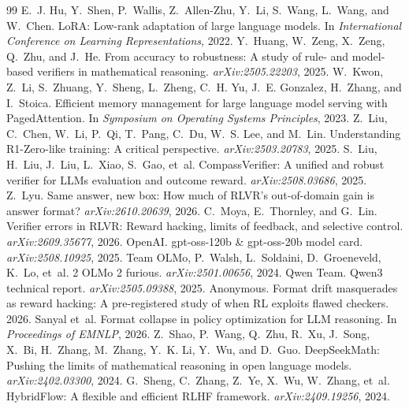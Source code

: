 \documentclass[10pt]{article}
\begin{document}
\begin{thebibliography}{99}
 E.~J. Hu, Y.~Shen, P.~Wallis, Z.~Allen-Zhu, Y.~Li, S.~Wang, L.~Wang, and W.~Chen. {LoRA}: Low-rank adaptation of large language models. In \emph{International Conference on Learning Representations}, 2022.
 Y.~Huang, W.~Zeng, X.~Zeng, Q.~Zhu, and J.~He. From accuracy to robustness: A study of rule- and model-based verifiers in mathematical reasoning. \emph{arXiv:2505.22203}, 2025.
 W.~Kwon, Z.~Li, S.~Zhuang, Y.~Sheng, L.~Zheng, C.~H. Yu, J.~E. Gonzalez, H.~Zhang, and I.~Stoica. Efficient memory management for large language model serving with {PagedAttention}. In \emph{Symposium on Operating Systems Principles}, 2023.
 Z.~Liu, C.~Chen, W.~Li, P.~Qi, T.~Pang, C.~Du, W.~S. Lee, and M.~Lin. Understanding {R1-Zero}-like training: A critical perspective. \emph{arXiv:2503.20783}, 2025.
 S.~Liu, H.~Liu, J.~Liu, L.~Xiao, S.~Gao, et~al. {CompassVerifier}: A unified and robust verifier for {LLMs} evaluation and outcome reward. \emph{arXiv:2508.03686}, 2025.
 Z.~Lyu. Same answer, new box: How much of {RLVR}'s out-of-domain gain is answer format? \emph{arXiv:2610.20639}, 2026.
 C.~Moya, E.~Thornley, and G.~Lin. Verifier errors in {RLVR}: Reward hacking, limits of feedback, and selective control. \emph{arXiv:2609.35677}, 2026.
 OpenAI. gpt-oss-120b \& gpt-oss-20b model card. \emph{arXiv:2508.10925}, 2025.
 Team OLMo, P.~Walsh, L.~Soldaini, D.~Groeneveld, K.~Lo, et~al. 2 {OLMo} 2 furious. \emph{arXiv:2501.00656}, 2024.
 Qwen Team. Qwen3 technical report. \emph{arXiv:2505.09388}, 2025.
 Anonymous. Format drift masquerades as reward hacking: A pre-registered study of when {RL} exploits flawed checkers. 2026.
 Sanyal et~al. Format collapse in policy optimization for {LLM} reasoning. In \emph{Proceedings of EMNLP}, 2026.
 Z.~Shao, P.~Wang, Q.~Zhu, R.~Xu, J.~Song, X.~Bi, H.~Zhang, M.~Zhang, Y.~K. Li, Y.~Wu, and D.~Guo. {DeepSeekMath}: Pushing the limits of mathematical reasoning in open language models. \emph{arXiv:2402.03300}, 2024.
 G.~Sheng, C.~Zhang, Z.~Ye, X.~Wu, W.~Zhang, et~al. {HybridFlow}: A flexible and efficient {RLHF} framework. \emph{arXiv:2409.19256}, 2024.

\end{thebibliography}
\end{document}
